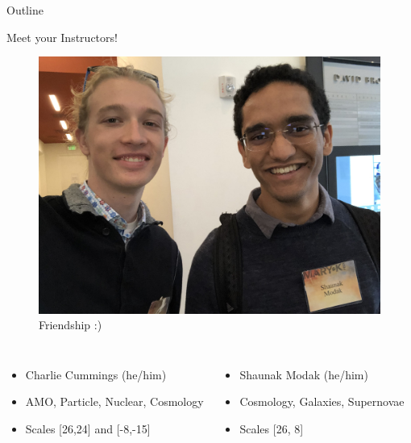 \documentclass[10pt,xcolor={table,dvipsnames},t]{beamer}
\begin{document}
\begin{frame}{Outline}
    \tableofcontents
\end{frame}

\begin{frame}{Meet your Instructors!}
\begin{figure}
    \centering
    \includegraphics[scale=0.051]{IMG_0737_up.jpeg} \\
    \small{Friendship :)}
\end{figure}
    \begin{columns}[c]
            \vspace{-5pt}
            \begin{itemize}
                \item Charlie Cummings (he/him)
                \item AMO, Particle, Nuclear, Cosmology 
                \item Scales [26,24] and [-8,-15]
            \end{itemize}
            \vspace{-5pt}
            \begin{itemize}
                \item Shaunak Modak (he/him)
                \item Cosmology, Galaxies, Supernovae
                \item Scales [26, 8]
            \end{itemize}
    \end{columns}
\end{frame}
\end{document}
